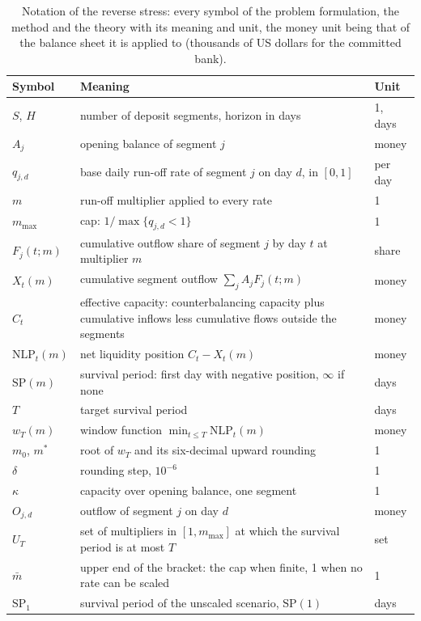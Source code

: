 \begin{table}[htbp]
\centering
\small
\setlength{\tabcolsep}{3pt}
\caption{Notation of the reverse stress: every symbol of the problem formulation, the method and the theory with its meaning and unit, the money unit being that of the balance sheet it is applied to (thousands of US dollars for the committed bank).}
\label{tab:notation}
\begin{tabular}{lp{9.2cm}l}
\toprule
Symbol & Meaning & Unit \\
\midrule
$S$, $H$ & number of deposit segments, horizon in days & 1, days \\
$A_j$ & opening balance of segment $j$ & money \\
$q_{j,d}$ & base daily run-off rate of segment $j$ on day $d$, in $[0,1]$ & per day \\
$m$ & run-off multiplier applied to every rate & 1 \\
$m_{\max}$ & cap: $1/\max\{q_{j,d}<1\}$ & 1 \\
$F_j(t;m)$ & cumulative outflow share of segment $j$ by day $t$ at multiplier $m$ & share \\
$X_t(m)$ & cumulative segment outflow $\sum_j A_j F_j(t;m)$ & money \\
$C_t$ & effective capacity: counterbalancing capacity plus cumulative inflows less cumulative flows outside the segments & money \\
$\mathrm{NLP}_t(m)$ & net liquidity position $C_t-X_t(m)$ & money \\
$\mathrm{SP}(m)$ & survival period: first day with negative position, $\infty$ if none & days \\
$T$ & target survival period & days \\
$w_T(m)$ & window function $\min_{t\le T}\mathrm{NLP}_t(m)$ & money \\
$m_0$, $m^\ast$ & root of $w_T$ and its six-decimal upward rounding & 1 \\
$\delta$ & rounding step, $10^{-6}$ & 1 \\
$\kappa$ & capacity over opening balance, one segment & 1 \\
$O_{j,d}$ & outflow of segment $j$ on day $d$ & money \\
$U_T$ & set of multipliers in $[1,m_{\max}]$ at which the survival period is at most $T$ & set \\
$\bar m$ & upper end of the bracket: the cap when finite, 1 when no rate can be scaled & 1 \\
$\mathrm{SP}_1$ & survival period of the unscaled scenario, $\mathrm{SP}(1)$ & days \\

\end{tabular}
\end{table}
